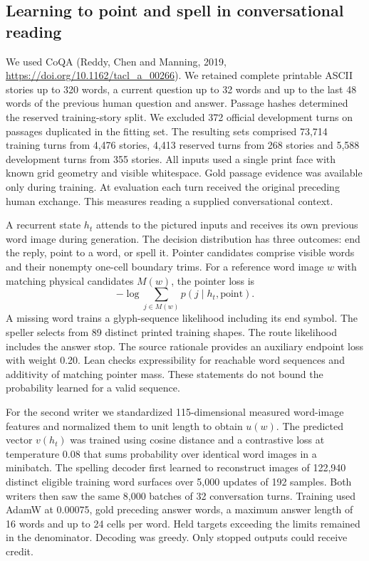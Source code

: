 \subsection*{Learning to point and spell in conversational reading}
We used CoQA (Reddy, Chen and Manning, 2019, \url{https://doi.org/10.1162/tacl_a_00266}). We retained complete printable ASCII stories up to 320 words, a current question up to 32 words and up to the last 48 words of the previous human question and answer. Passage hashes determined the reserved training-story split. We excluded 372 official development turns on passages duplicated in the fitting set. The resulting sets comprised 73,714 training turns from 4,476 stories, 4,413 reserved turns from 268 stories and 5,588 development turns from 355 stories. All inputs used a single print face with known grid geometry and visible whitespace. Gold passage evidence was available only during training. At evaluation each turn received the original preceding human exchange. This measures reading a supplied conversational context.

A recurrent state $h_t$ attends to the pictured inputs and receives its own previous word image during generation. The decision distribution has three outcomes: end the reply, point to a word, or spell it. Pointer candidates comprise visible words and their nonempty one-cell boundary trims. For a reference word image $w$ with matching physical candidates $M(w)$, the pointer loss is
\[
 -\log \sum_{j\in M(w)}p(j\mid h_t,\mathrm{point}).
\]
A missing word trains a glyph-sequence likelihood including its end symbol. The speller selects from 89 distinct printed training shapes. The route likelihood includes the answer stop. The source rationale provides an auxiliary endpoint loss with weight 0.20. Lean checks expressibility for reachable word sequences and additivity of matching pointer mass. These statements do not bound the probability learned for a valid sequence.

For the second writer we standardized 115-dimensional measured word-image features and normalized them to unit length to obtain $u(w)$. The predicted vector $v(h_t)$ was trained using cosine distance and a contrastive loss at temperature 0.08 that sums probability over identical word images in a minibatch. The spelling decoder first learned to reconstruct images of 122,940 distinct eligible training word surfaces over 5,000 updates of 192 samples. Both writers then saw the same 8,000 batches of 32 conversation turns. Training used AdamW at 0.00075, gold preceding answer words, a maximum answer length of 16 words and up to 24 cells per word. Held targets exceeding the limits remained in the denominator. Decoding was greedy. Only stopped outputs could receive credit.

